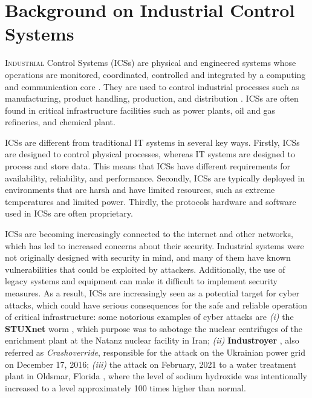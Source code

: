 \chapter{Background on Industrial Control Systems}
\label{background}

\lettrine[lines=2]{I}{ndustrial} Control Systems (ICSs) are physical and engineered systems whose operations are monitored, coordinated, controlled and integrated by a computing and communication core \cite{ics_definition_giusta}. They are used to control industrial processes such as manufacturing, product handling, production, and distribution \cite{ics_definition}. ICSs are often found in critical infrastructure facilities such as power plants, oil and gas refineries, and chemical plant.

\bigskip
ICSs are different from traditional IT systems in several key ways. Firstly, ICSs are designed to control physical processes, whereas IT systems are designed to process and store data. This means that ICSs have different requirements for availability, reliability, and performance. Secondly, ICSs are typically deployed in environments that are harsh and have limited resources, such as extreme temperatures and limited power. Thirdly, the protocols hardware and software used in ICSs are often proprietary. 

\bigskip
ICSs are becoming increasingly connected to the internet and other networks, which has led to increased concerns about their security. Industrial systems were not originally designed with security in mind, and many of them have known vulnerabilities that could be exploited by attackers. Additionally, the use of legacy systems and equipment can make it difficult to implement security measures. As a result, ICSs are increasingly seen as a potential target for cyber attacks, which could have serious consequences for the safe and reliable operation of critical infrastructure: some notorious examples of cyber attacks are \textit{(i)} the \textbf{STUXnet} worm \cite{stuxnet}, which purpose was to sabotage the nuclear centrifuges of the enrichment plant at the Natanz nuclear facility in Iran; \textit{(ii)} \textbf{Industroyer} \cite{industroyer}, also referred as \textit{Crashoverride}, responsible for the attack on the Ukrainian power grid on December 17, 2016; \textit{(iii)} the attack on February, 2021 to a water treatment plant in Oldsmar, Florida \cite{attacco_florida}, where the level of sodium hydroxide was intentionally increased to a level approximately 100 times higher than normal. 


